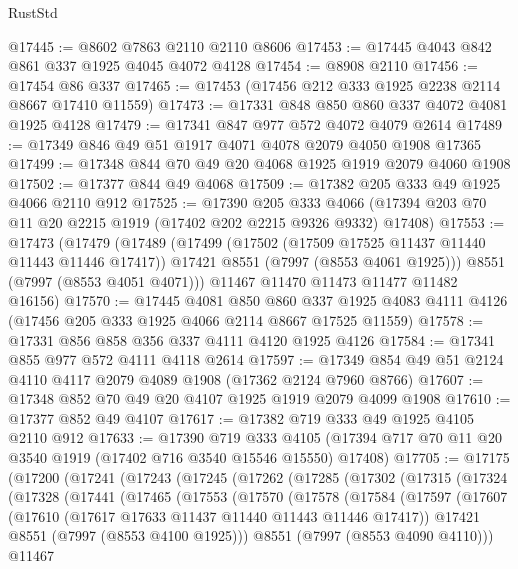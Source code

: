 \begin{lexlean}{RustStd}
\begin{coremodule}
{\begin{coremodule}
{{{{{{{{{{{{{{{{{{{{{{{{{{{{{{{{{{{{{{{{{{{@17445 := @8602 @7863 @2110 @2110 @8606
@17453 := @17445 @4043 @842 @861 @337 @1925 @4045 @4072 @4128
@17454 := @8908 @2110
@17456 := @17454 @86 @337
@17465 := @17453 (@17456 @212 @333 @1925 @2238 @2114 @8667 @17410 @11559)
@17473 := @17331 @848 @850 @860 @337 @4072 @4081 @1925 @4128
@17479 := @17341 @847 @977 @572 @4072 @4079 @2614
@17489 := @17349 @846 @49 @51 @1917 @4071 @4078 @2079 @4050 @1908 @17365
@17499 := @17348 @844 @70 @49 @20 @4068 @1925 @1919 @2079 @4060 @1908
@17502 := @17377 @844 @49 @4068
@17509 := @17382 @205 @333 @49 @1925 @4066 @2110 @912
@17525 := @17390
    @205
    @333
    @4066
    (@17394 @203 @70 @11 @20 @2215 @1919 (@17402 @202 @2215 @9326 @9332) @17408)
@17553 := @17473
    (@17479
      (@17489
        (@17499
          (@17502 (@17509 @17525 @11437 @11440 @11443 @11446 @17417))
          @17421
          @8551
          (@7997 (@8553 @4061 @1925)))
        @8551
        (@7997 (@8553 @4051 @4071)))
      @11467
      @11470
      @11473
      @11477
      @11482
      @16156)
@17570 := @17445
    @4081
    @850
    @860
    @337
    @1925
    @4083
    @4111
    @4126
    (@17456 @205 @333 @1925 @4066 @2114 @8667 @17525 @11559)
@17578 := @17331 @856 @858 @356 @337 @4111 @4120 @1925 @4126
@17584 := @17341 @855 @977 @572 @4111 @4118 @2614
@17597 := @17349 @854 @49 @51 @2124 @4110 @4117 @2079 @4089 @1908 (@17362 @2124 @7960 @8766)
@17607 := @17348 @852 @70 @49 @20 @4107 @1925 @1919 @2079 @4099 @1908
@17610 := @17377 @852 @49 @4107
@17617 := @17382 @719 @333 @49 @1925 @4105 @2110 @912
@17633 := @17390
    @719
    @333
    @4105
    (@17394 @717 @70 @11 @20 @3540 @1919 (@17402 @716 @3540 @15546 @15550) @17408)
@17705 := @17175
    (@17200
      (@17241
        (@17243
          (@17245
            (@17262
              (@17285
                (@17302
                  (@17315
                    (@17324
                      (@17328
                        (@17441
                          (@17465
                            (@17553
                              (@17570
                                (@17578
                                  (@17584
                                    (@17597
                                      (@17607
                                        (@17610 (@17617 @17633 @11437 @11440 @11443 @11446 @17417))
                                        @17421
                                        @8551
                                        (@7997 (@8553 @4100 @1925)))
                                      @8551
                                      (@7997 (@8553 @4090 @4110)))
                                    @11467
}}}}}}}}}}}}}}}}}}}}}}}}}}}}}}}}}}}}}}}}}}}
\end{coremodule}}
\end{coremodule}
\end{lexlean}
